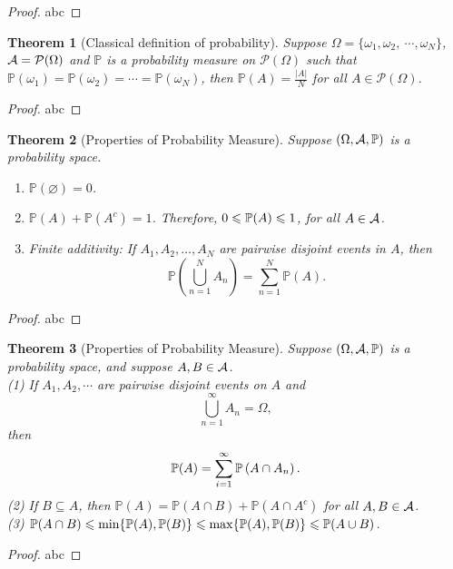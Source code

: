 \documentclass[openany,12pt]{book}
\newtheorem{theorem}{Theorem}[chapter]
\begin{document}
\begin{proof}
  abc
\end{proof}

\begin{theorem}[Classical definition of probability]
  Suppose $\Omega=\{\omega_1,\omega_2,\ \cdots,\omega_N\}$, $\mathcal{A}=\mathcal{P}(\Omega)$ and $\mathbb{P}$ is a probability measure on $\mathcal{P}(\Omega)$ such that $\mathbb{P}({\omega_1})=\mathbb{P}({\omega_2})=\cdots=\mathbb{P}({\omega_N})$, then $\mathbb{P}(A)=\frac{|A|}{N}$ for all $A\in\mathcal{P}(\Omega)$.
\end{theorem}

\begin{proof}
  abc
\end{proof}

\begin{theorem}[Properties of Probability Measure]
  Suppose $(\Omega,\mathcal{A},\mathbb{P})$ is a probability space.
  \begin{enumerate}
    \item $\mathbb{P}(\varnothing)=0$.
    \item $\mathbb{P}(A)+\mathbb{P}(A^c)=1$. Therefore, $0\leqslant\mathbb{P}(A)\leqslant1$, for all $A\in\mathcal{A}$.
    \item Finite additivity: If $A_1,A_2,\dots,A_N$ are pairwise disjoint events in $A$, then $$\mathbb{P}\left(\bigcup_{n=1}^NA_n \right)=\sum_{n=1}^N\mathbb{P}(A).$$
  \end{enumerate}
\end{theorem}

\begin{proof}
  abc
\end{proof}

\begin{theorem}[Properties of Probability Measure]
Suppose $(\Omega,\mathcal{A},\mathbb{P})$ is a probability space, and suppose $A,B\in\mathcal{A}$.
\\
(1) If $A_1,A_2,\cdots$ are pairwise disjoint events on $A$ and 
$$ \bigcup_{n=1}^\infty A_n =\Omega,$$ then 
$$\mathbb{P}(A)= \sum_{i=1}^{\infty} \mathbb{P}\left(A \cap A_n \right).$$
(2) If $B\subseteq A$, then $\mathbb{P}(A)=\mathbb{P}(A\cap B)+\mathbb{P}(A\cap A^c )$ for all $A,B\in\mathcal{A}$.\\
(3) $\mathbb{P}(A\cap B)  \leqslant \min \{\mathbb{P}(A),\mathbb{P}(B)\}  \leqslant \max\{ \mathbb{P}(A),\mathbb{P}(B)\} \leqslant  \mathbb{P}(A\cup B)$.
\end{theorem}

\begin{proof}
  abc
\end{proof}
\end{document}
